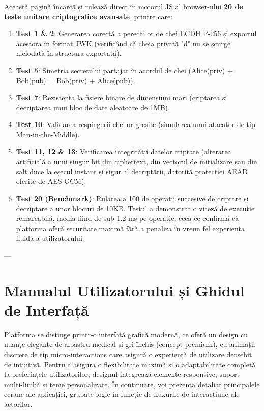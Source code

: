 Această pagină încarcă și rulează direct în motorul JS al browser-ului \textbf{20 de teste unitare criptografice avansate}, printre care:
\begin{enumerate}
    \item \textbf{Test 1 \& 2}: Generarea corectă a perechilor de chei ECDH P-256 și exportul acestora în format JWK (verificând că cheia privată "d" nu se scurge niciodată în structura exportată).
    \item \textbf{Test 5}: Simetria secretului partajat în acordul de chei (Alice(priv) + Bob(pub) = Bob(priv) + Alice(pub)).
    \item \textbf{Test 7}: Rezistența la fișiere binare de dimensiuni mari (criptarea și decriptarea unui bloc de date aleatoare de 1MB).
    \item \textbf{Test 10}: Validarea respingerii cheilor greșite (simularea unui atacator de tip Man-in-the-Middle).
    \item \textbf{Test 11, 12 \& 13}: Verificarea integrității datelor criptate (alterarea artificială a unui singur bit din ciphertext, din vectorul de inițializare sau din salt duce la eșecul instant și sigur al decriptării, datorită protecției AEAD oferite de AES-GCM).
    \item \textbf{Test 20 (Benchmark)}: Rularea a 100 de operații succesive de criptare și decriptare a unor blocuri de 10KB. Testul a demonstrat o viteză de execuție remarcabilă, media fiind de sub 1.2 ms pe operație, ceea ce confirmă că platforma oferă securitate maximă fără a penaliza în vreun fel experiența fluidă a utilizatorului.
\end{enumerate}

---

\section{Manualul Utilizatorului și Ghidul de Interfață}
\label{sec:ch4sec5}

Platforma se distinge printr-o interfață grafică modernă, ce oferă un design cu nuanțe elegante de albastru medical și gri închis (concept premium), cu animații discrete de tip micro-interactions care asigură o experiență de utilizare deosebit de intuitivă. Pentru a asigura o flexibilitate maximă și o adaptabilitate completă la preferințele utilizatorilor, designul integrează elemente responsive, suport multi-limbă și teme personalizate. În continuare, voi prezenta detaliat principalele ecrane ale aplicației, grupate logic în funcție de fluxurile de interacțiune ale actorilor.

